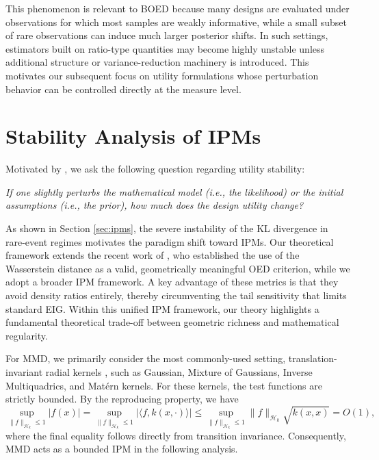 \documentclass[twoside,11pt]{article}
\begin{document}
This phenomenon is relevant to BOED because many designs are evaluated under observations for which most samples are weakly informative, while a small subset of rare observations can induce much larger posterior shifts. In such settings, estimators built on ratio-type quantities may become highly unstable unless additional structure or variance-reduction machinery is introduced. This motivates our subsequent focus on utility formulations whose perturbation behavior can be controlled directly at the measure level.

\section{Stability Analysis of IPMs}
\label{sec:stability_analysis}

Motivated by \cite{helin2025bayesian}, we ask the following question regarding utility stability:
\begin{tcolorbox}[colback=white,colframe=black,boxrule=0.8pt,arc=2pt]
\begin{center}
\textit{If one slightly perturbs the mathematical model (i.e., the likelihood) or the initial assumptions (i.e., the prior), how much does the design utility change?}
\end{center}
\end{tcolorbox}

As shown in Section \ref{sec:ipms}, the severe instability of the KL divergence in rare-event regimes motivates the paradigm shift toward IPMs. Our theoretical framework extends the recent work of \cite{helin2025bayesian}, who established the use of the Wasserstein distance as a valid, geometrically meaningful OED criterion, while we adopt a broader IPM framework. A key advantage of these metrics is that they avoid density ratios entirely, thereby circumventing the tail sensitivity that limits standard EIG. Within this unified IPM framework, our theory highlights a fundamental theoretical trade-off between geometric richness and mathematical regularity.

For MMD, we primarily consider the most commonly-used setting, translation-invariant radial kernels \citep{tolstikhin2017minimax}, such as Gaussian, Mixture of Gaussians, Inverse Multiquadrics, and Mat\'ern kernels. For these kernels, the test functions are strictly bounded. By the reproducing property, we have
$$\sup_{\|f\|_{\mathcal{H}_k}\leq 1}|f(x)|=\sup_{\|f\|_{\mathcal{H}_k}\leq 1}|\langle f,k(x,\cdot)\rangle|\leq\sup_{\|f\|_{\mathcal{H}_k}\leq 1}\|f\|_{\mathcal{H}_k}\sqrt{k(x,x)}=O(1),$$
where the final equality follows directly from transition invariance. Consequently, MMD acts as a bounded IPM in the following analysis. 
\end{document}
